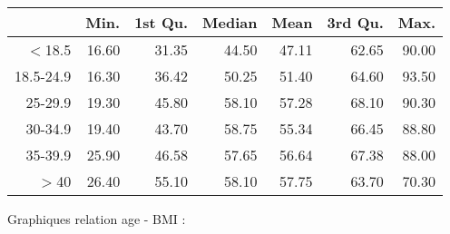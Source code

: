 \documentclass[11pt,a4paper]{article}\usepackage[]{graphicx}\usepackage[]{color}
\begin{document}
\begin{table}[H]
\centering
\begin{tabular}{rrrrrrr}
  \hline
 & Min. & 1st Qu. & Median & Mean & 3rd Qu. & Max. \\ 
  \hline
$<$18.5 & 16.60 & 31.35 & 44.50 & 47.11 & 62.65 & 90.00 \\ 
  18.5-24.9 & 16.30 & 36.42 & 50.25 & 51.40 & 64.60 & 93.50 \\ 
  25-29.9 & 19.30 & 45.80 & 58.10 & 57.28 & 68.10 & 90.30 \\ 
  30-34.9 & 19.40 & 43.70 & 58.75 & 55.34 & 66.45 & 88.80 \\ 
  35-39.9 & 25.90 & 46.58 & 57.65 & 56.64 & 67.38 & 88.00 \\ 
  $>$40 & 26.40 & 55.10 & 58.10 & 57.75 & 63.70 & 70.30 \\ 
   \hline
\end{tabular}
\end{table}


Graphiques relation age - BMI :
\end{document}
